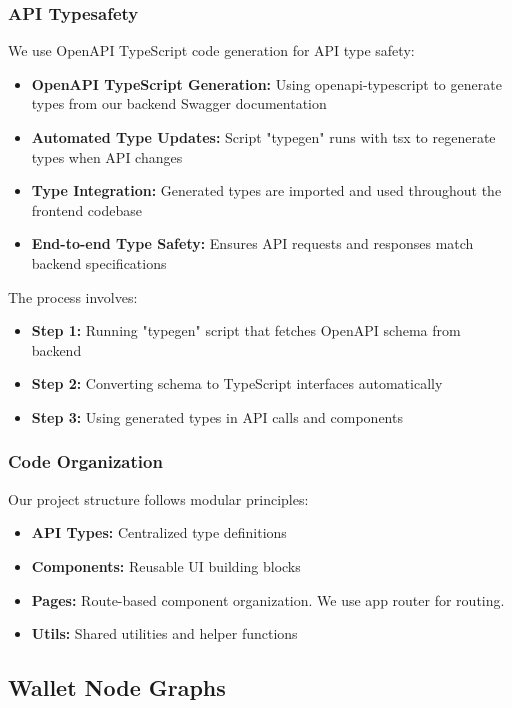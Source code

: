 \subsubsection{API Typesafety}

We use OpenAPI TypeScript code generation for API type safety:
\begin{itemize}
    \item \textbf{OpenAPI TypeScript Generation:} Using openapi-typescript to generate types from our backend Swagger documentation
    \item \textbf{Automated Type Updates:} Script "typegen" runs with tsx to regenerate types when API changes
    \item \textbf{Type Integration:} Generated types are imported and used throughout the frontend codebase
    \item \textbf{End-to-end Type Safety:} Ensures API requests and responses match backend specifications
\end{itemize}

The process involves:
\begin{itemize}
    \item \textbf{Step 1:} Running "typegen" script that fetches OpenAPI schema from backend
    \item \textbf{Step 2:} Converting schema to TypeScript interfaces automatically
    \item \textbf{Step 3:} Using generated types in API calls and components
\end{itemize}

\subsubsection{Code Organization}
Our project structure follows modular principles:
\begin{itemize}
    \item \textbf{API Types:} Centralized type definitions
    \item \textbf{Components:} Reusable UI building blocks
    \item \textbf{Pages:} Route-based component organization. We use app router for routing.
    \item \textbf{Utils:} Shared utilities and helper functions
\end{itemize}


\subsection{Wallet Node Graphs}

